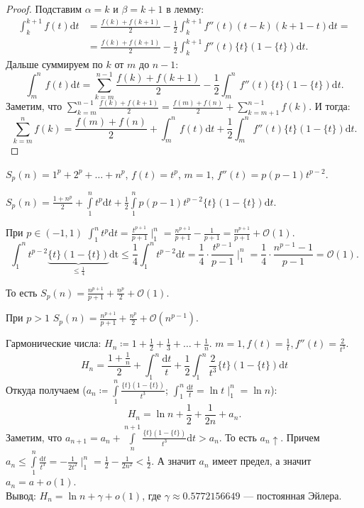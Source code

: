 \begin{proof}
    Подставим $\alpha = k$ и  $\beta = k + 1$ в лемму:
    \begin{align*}
        \int_{k}^{k+1} f(t) \mathrm{d}t &= \frac{f(k) + f(k + 1)}{2} - \frac{1}{2} \int_k^{k+1} f''(t)(t-k)(k+1-t) \mathrm{d}t = \\ &= \frac{f(k) + f(k + 1)}{2} - \frac{1}{2} \int_{k}^{k+1} f''(t) \{t\}(1-\{t\}) \mathrm{d}t
        .\end{align*} Дальше суммируем по $k$ от  $m$ до  $n-1$:  \[
    \int_m^n f(t) \mathrm{d}t = \sum_{k=m}^{n-1} \frac{f(k) + f(k + 1)}{2} - \frac{1}{2} \int_m^n f''(t)\{t\}(1-\{t\}) \mathrm{d}t
.\] Заметим, что $\sum\limits_{k=m}^{n-1} \frac{f(k) + f(k + 1)}{2} = \frac{f(m) + f(n)}{2} + \sum_{k=m+1}^{n-1} f(k)$. И тогда: 
\[
    \sum_{k=m}^n f(k) = \frac{f(m) + f(n)}{2} + \int_m^n f(t)\mathrm{d}t + \frac{1}{2} \int_m^n f''(t)\{t\}(1-\{t\})\mathrm{d}t
.\] 
\end{proof}
\begin{example}
    $S_p(n) = 1^p + 2^p + \ldots + n^p$, $f(t) = t^p$,  $m = 1$,  $f''(t) = p(p-1)t^{p-2}$.

    $S_p(n) = \frac{1+n^p}{2} + \int\limits_1^n t^p \mathrm{d}t + \frac{1}{2} \int\limits_1^n p(p-1)t^{p-2} \{t\}(1-\{t\}) \mathrm{d}t$.

    При $p \in (-1, 1)$  $\int_1^n t^p \mathrm{d}t = \frac{t^{p+1}}{p+1} \mid_1^n = \frac{n^{p+1}}{p+1} - \frac{1}{p+1} = \frac{n^{p+1}}{p+1} + \mathcal{O}(1)$.\[
        \int_1^n t^{p-2} \underbrace{\{t\}(1-\{t\})}_{\le \frac{1}{4}} \mathrm{dt} \le \frac{1}{4} \int_1^n t^{p-2} \mathrm{d}t = \frac{1}{4} \cdot \frac{t^{p-1}}{p-1} \mid_1^n = \frac{1}{4} \cdot \frac{n^{p-1} - 1}{p - 1} = \mathcal{O}(1)
    .\] 

    То есть $S_p(n) = \frac{n^{p+1}}{p+1} + \frac{n^p}{2} + \mathcal{O}(1)$.

    При $p > 1$  $S_p(n) = \frac{n^{p+1}}{p+1} + \frac{n^p}{2} + \mathcal{O}(n^{p-1})$.
\end{example}
\begin{example}
    Гармонические числа: $H_n \coloneqq 1 + \frac{1}{2} + \frac{1}{3} + \ldots + \frac{1}{n}$. $m = 1, f(t) = \frac{1}{t}, f''(t) = \frac{2}{t^3}$.
    \[
    H_n = \frac{1 + \frac{1}{n}}{2} + \int_1^n \frac{\mathrm{d}t}{t} + \frac{1}{2} \int_1^n \frac{2}{t^3}\{t\}(1-\{t\})\mathrm{d}t
    \] Откуда получаем ($a_n \coloneqq \int\limits_1^n \frac{\{t\}(1-\{t\})}{t^3}$; $\int_1^n \frac{\mathrm{d}t}{t} = \ln t \mid_1^n = \ln n$): \[
H_n = \ln n + \frac{1}{2} + \frac{1}{2n} + a_n
.\] Заметим, что $a_{n+1} = a_n + \int\limits_n^{n+1}\frac{\{t\}(1-\{t\})}{t^3} \mathrm{d}t > a_n$. То есть $a_n\uparrow$. Причем $a_n \le \int\limits_1^n \frac{\mathrm{d}t}{t^3} = -\frac{1}{2t^2} \mid_1^n = \frac{1}{2} - \frac{1}{2n^2} < \frac{1}{2}$. А значит $a_n$ имеет предел, а значит  $a_n = a + o(1)$.
\\
Вывод:  $H_n = \ln n + \gamma + o(1)$, где  $\gamma \approx 0.5772156649$ --- постоянная Эйлера.
\end{example}
